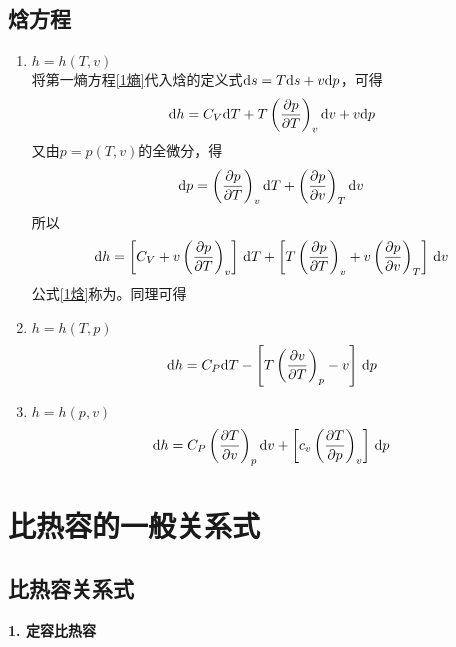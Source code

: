 \subsection{焓方程}
\begin{enumerate}[1.]
	\item $h = h(T,v)$\\
	将第一熵方程\eqref{1熵}代入焓的定义式${\rm{d}} s = T {\rm{d}} s + v {\rm{d}} p$，可得
	\begin{align*}
		{\rm{d}} h = C_V {\rm{d}} T + T \left(\dfrac{\partial p}{\partial T}\right)_v {\rm{d}} v + v {\rm{d}} p
	\end{align*}
	又由$p = p(T,v)$的全微分，得
	\begin{align*}
		{\rm{d}} p = \left(\dfrac{\partial p}{\partial T}\right)_v {\rm{d}} T + \left(\dfrac{\partial p}{\partial v}\right)_T {\rm{d}} v
	\end{align*}
	所以
	\begin{align}
		{\rm{d}} h = \left[C_V + v \left(\dfrac{\partial p}{\partial T}\right)_v\right]\,{\rm{d}} T + \left[T \left(\dfrac{\partial p}{\partial T}\right)_v + v \left(\dfrac{\partial p}{\partial v}\right)_T\right]\, {\rm{d}} v
		\label{1焓}
	\end{align}
	公式\eqref{1焓}称为。同理可得
	
	\item $h = h(T, p)$\\
	\begin{align}
		{\rm{d}} h = C_P {\rm{d}} T - \left[T \left(\dfrac{\partial v}{\partial T}\right)_p - v\right]\, {\rm{d}} p
	\end{align}

	\item $h = h(p,v)$\\
	\begin{align}
		{\rm{d}} h = C_P \left(\dfrac{\partial T}{\partial v}\right)_p {\rm{d}} v + \left[c_v \left(\dfrac{\partial T}{\partial p}\right)_v\right]\, {\rm{d}} p
	\end{align} 
\end{enumerate}

\section{比热容的一般关系式}

\subsection{比热容关系式}
\noindent \textbf{1. 定容比热容}

